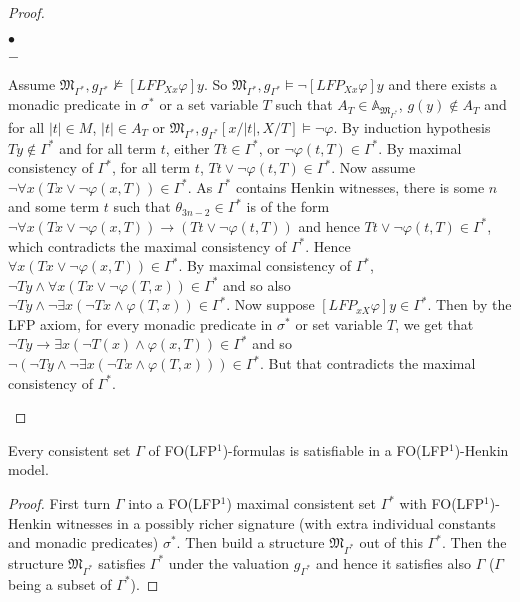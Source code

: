 \documentclass{LMCS}
\newcommand{\frM}{\mathfrak{M}}
\newcommand{\folfp}{\textsf{FO(LFP$^1$)}\xspace}
\begin{document}
\begin{proof}
\begin{iteMize}{$\bullet$}
\begin{iteMize}{$-$}
\begin{center}
    \end{center}
    Assume $\frM_{\Gamma^*}, g_{\Gamma^*} \not\models [LFP_{Xx}\varphi]y$. So $\frM_{\Gamma^*},
    g_{\Gamma^*} \models \neg [LFP_{Xx}\varphi]y$ and there exists a monadic predicate in $\sigma^*$ or a set variable $T$ such that $A_T \in \mathbb{A}_{\frM_{\Gamma^*}}$, $g(y) \notin A_T$ and
    for all $|t| \in M$, $|t|\in A_T$ or $\frM_{\Gamma^*}, g_{\Gamma^*}[x/|t|,X/T]
    \models \neg \varphi$. By induction hypothesis $Ty \not\in \Gamma^*$ and for all term $t$, either $Tt \in \Gamma^*$, or $\neg \varphi(t,T) \in \Gamma^*$. By maximal consistency of $\Gamma^*$, for all term $t$,
    $Tt \vee \neg \varphi(t,T) \in \Gamma^*$. Now assume $\neg \forall x(Tx \vee \neg \varphi(x,T)) \in \Gamma^*$. As $\Gamma^*$ contains Henkin witnesses, there is some $n$ and some term $t$ such that $\theta_{3n-2} \in \Gamma^*$ is of the  form $\neg \forall x (Tx \vee \neg \varphi(x,T))\rightarrow (Tt \vee \neg \varphi(t,T))$ and hence $Tt \vee \neg \varphi(t,T) \in \Gamma^*$, which contradicts the maximal consistency of $\Gamma^*$. Hence $\forall x(Tx \vee \neg \varphi(x,T)) \in \Gamma^*$.
 By maximal consistency of $\Gamma^*$, $\neg Ty \wedge \forall x (Tx
    \vee \neg \varphi(T,x)) \in \Gamma^*$ and so also $\neg Ty \wedge \neg \exists x(\neg Tx \wedge \varphi(T,x)) \in \Gamma^*$. Now suppose $[LFP_{xX}\varphi]y \in \Gamma^*$. Then by the LFP axiom,
    for every monadic predicate  in $\sigma^*$ or set variable $T$, we get that $\neg Ty \rightarrow \exists x(\neg T(x) \wedge \varphi(x,T)) \in \Gamma^*$ and so $\neg(\neg Ty \wedge \neg \exists x(\neg Tx \wedge \varphi(T,x))) \in \Gamma^*$. But that
    contradicts the maximal consistency of $\Gamma^*$. 
   \end{iteMize}
\end{iteMize}
\end{proof}

\begin{thm}
Every consistent set $\Gamma$ of \folfp-formulas is satisfiable in a \folfp-Henkin model.\label{folfpcomp}
\end{thm}

\begin{proof}
First turn $\Gamma$ into a \folfp maximal consistent set $\Gamma^*$ with \folfp-Henkin witnesses in a possibly richer signature (with extra
individual constants and monadic predicates) $\sigma^*$. Then build a structure $\frM_{\Gamma^*}$ out of this $\Gamma^*$. Then the structure
$\frM_{\Gamma^*}$ satisfies $\Gamma^*$ under the valuation $g_{\Gamma^*}$ and hence it satisfies also $\Gamma$ ($\Gamma$ being a subset of $\Gamma^*$).
\end{proof}
\end{document}
